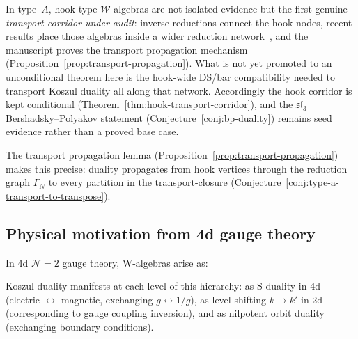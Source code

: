 \begin{remark}
\label{rem:hook-type-evidence}
In type~$A$, hook-type $\mathcal{W}$-algebras are not isolated
evidence but the first genuine \emph{transport corridor under audit}:
inverse reductions connect the hook nodes, recent results place those
algebras inside a wider reduction
network~\cite{FehilyHook,CLNS24,CFLN24,GenraStages,ButsonNair}, and
the manuscript proves the transport propagation mechanism
(Proposition~\ref{prop:transport-propagation}).  What is not yet
promoted to an unconditional theorem here is the hook-wide DS/bar
compatibility needed to transport Koszul duality all along that
network.  Accordingly the hook corridor is kept conditional
(Theorem~\ref{thm:hook-transport-corridor}), and the
$\mathfrak{sl}_3$ Bershadsky--Polyakov statement
(Conjecture~\ref{conj:bp-duality}) remains seed evidence rather
than a proved base case.

The transport propagation lemma
(Proposition~\ref{prop:transport-propagation}) makes this precise:
duality propagates from hook vertices through the reduction graph
$\Gamma_N$ to every partition in the transport-closure
(Conjecture~\ref{conj:type-a-transport-to-transpose}).
\end{remark}

\subsection{Physical motivation from 4d gauge theory}

\begin{remark}
In 4d $\mathcal{N}=2$ gauge theory, W-algebras arise as:
\begin{center}
\end{center}

Koszul duality manifests at each level of this hierarchy: as S-duality in 4d (electric $\leftrightarrow$ magnetic, exchanging $g \leftrightarrow 1/g$), as level shifting $k \to k'$ in 2d (corresponding to gauge coupling inversion), and as nilpotent orbit duality (exchanging boundary conditions).
\end{remark}


